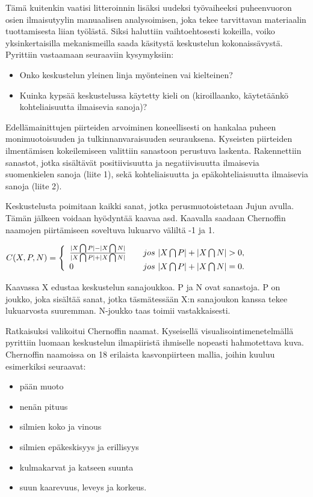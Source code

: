 \documentclass[11pt,a4paper,oneside]{memoir}
\begin{document}
Tämä kuitenkin vaatisi litteroinnin lisäksi uudeksi työvaiheeksi puheenvuoron osien ilmaisutyylin manuaalisen analysoimisen, joka tekee tarvittavan materiaalin tuottamisesta liian työlästä. Siksi haluttiin vaihtoehtosesti kokeilla, voiko yksinkertaisilla mekanismeilla saada käsitystä keskustelun kokonaissävystä. Pyrittiin vastaamaan seuraaviin kysymyksiin:
\begin{itemize}
\item{Onko keskustelun yleinen linja myönteinen vai kielteinen?}
\item{Kuinka kypsää keskustelussa käytetty kieli on (kiroillaanko, käytetäänkö kohteliaisuutta ilmaisevia sanoja)?}
\end{itemize}

Edellämainittujen piirteiden arvoiminen koneellisesti on hankalaa puheen monimuotoisuuden ja tulkinnanvaraisuuden seurauksena. Kyseisten piirteiden ilmentämisen kokeilemiseen valittiin sanastoon perustuva laskenta. Rakennettiin sanastot, jotka sisältävät positiivisuutta ja negatiivisuutta ilmaisevia suomenkielen sanoja (liite 1), sekä kohteliaisuutta ja epäkohteliaisuutta ilmaisevia sanoja (liite 2).

Keskustelusta poimitaan kaikki sanat, jotka perusmuotoistetaan Jujun avulla. Tämän jälkeen voidaan hyödyntää kaavaa asd. Kaavalla saadaan Chernoffin naamojen piirtämiseen soveltuva lukuarvo väliltä -1 ja 1.

\begin{math}
  C(X, P, N) = \left\{ 
  \begin{array}{l l}
	\frac{| X \bigcap P | - | X \bigcap N |}{| X \bigcap P | + | X \bigcap N |} & \quad \text{$jos$ } {| X \bigcap P | + | X \bigcap N | > 0},\\
	0 & \quad \text{$jos$ } {| X \bigcap P | + | X \bigcap N |} = 0.\\	
  \end{array} \right.
\end{math}

Kaavassa X edustaa keskustelun sanajoukkoa. P ja N ovat sanastoja. P on joukko, joka sisältää sanat, jotka täsmätessään X:n sanajoukon kanssa tekee lukuarvosta suuremman. N-joukko taas toimii vastakkaisesti.

Ratkaisuksi valikoitui Chernoffin naamat. Kyseisellä visualisointimenetelmällä pyrittiin luomaan keskustelun ilmapiiristä ihmiselle nopeasti hahmotettava kuva. Chernoffin naamoissa on 18 erilaista kasvonpiirteen mallia, joihin kuuluu esimerkiksi seuraavat:
\begin{itemize}
\item{pään muoto}
\item{nenän pituus}
\item{silmien koko ja vinous}
\item{silmien epäkeskisyys ja erillisyys}
\item{kulmakarvat ja katseen suunta}
\item{suun kaarevuus, leveys ja korkeus.}
\end{itemize}
\end{document}
